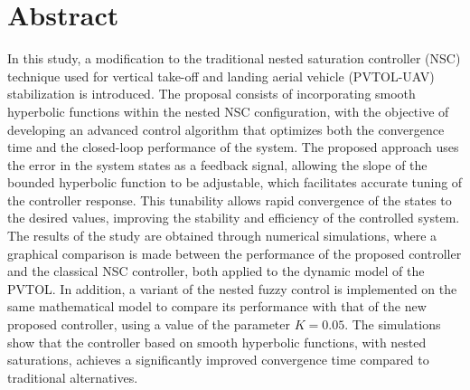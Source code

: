 \section*{Abstract}

In this study, a modification to the traditional nested saturation controller (NSC) technique used for vertical take-off and landing aerial vehicle (PVTOL-UAV) stabilization is introduced. The proposal consists of incorporating smooth hyperbolic functions within the nested NSC configuration, with the objective of developing an advanced control algorithm that optimizes both the convergence time and the closed-loop performance of the system.
The proposed approach uses the error in the system states as a feedback signal, allowing the slope of the bounded hyperbolic function to be adjustable, which facilitates accurate tuning of the controller response. This tunability allows rapid convergence of the states to the desired values, improving the stability and efficiency of the controlled system.
The results of the study are obtained through numerical simulations, where a graphical comparison is made between the performance of the proposed controller and the classical NSC controller, both applied to the dynamic model of the PVTOL. In addition, a variant of the nested fuzzy control is implemented on the same mathematical model to compare its performance with that of the new proposed controller, using a value of the parameter $K = 0.05$. The simulations show that the controller based on smooth hyperbolic functions, with nested saturations, achieves a significantly improved convergence time compared to traditional alternatives.


